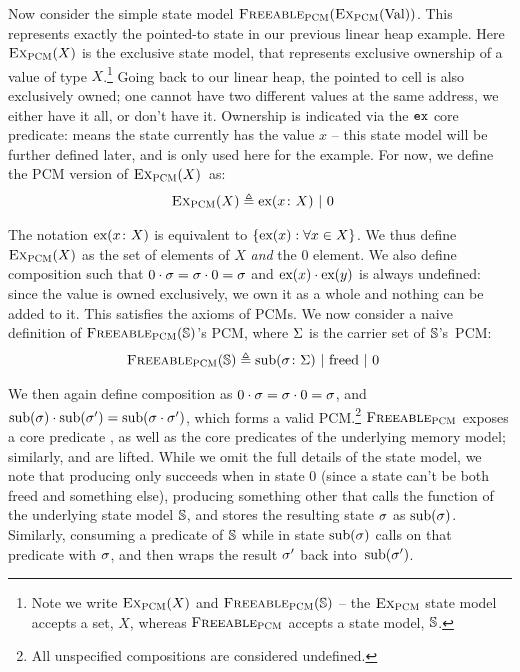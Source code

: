 Now consider the simple state model $\textsc{Freeable}_{\textsc{PCM}}(\textsc{Ex}_{\textsc{PCM}}(\text{Val}))$. This represents exactly the pointed-to state in our previous linear heap example. Here $\textsc{Ex}_{\textsc{PCM}}(X)$ is the exclusive state model, that represents exclusive ownership of a value of type $X$.\footnote{Note we write $\textsc{Ex}_{\textsc{PCM}}(X)$ and $\textsc{Freeable}_{\textsc{PCM}}(\mathbb S)$ -- the $\textsc{Ex}_{\textsc{PCM}}$ state model accepts a set, $X$, whereas $\textsc{Freeable}_{\textsc{PCM}}$ accepts a state model, $\mathbb S$.} Going back to our linear heap, the pointed to cell is also exclusively owned; one cannot have two different values at the same address, we either have it all, or don't have it. Ownership is indicated via the $\texttt{ex}$ core predicate:  means the state currently has the value $x$ -- this state model will be further defined later, and is only used here for the example. For now, we define the PCM version of $\textsc{Ex}_{\textsc{PCM}}(X)$~as:
\begin{align*}
	\textsc{Ex}_{\textsc{PCM}}(X) &\triangleq \text{ex}(x\colon X) ~|~ 0
\end{align*}

The notation $\text{ex}(x\colon X)$ is equivalent to $\{ \text{ex}(x) : \forall x\in X \}$. We thus define $\textsc{Ex}_{\textsc{PCM}}(X)$ as the set of elements of $X$ \emph{and} the $0$ element. We also define composition such that $0\cdot \sigma=\sigma\cdot 0=\sigma$ and $\text{ex}(x) \cdot \text{ex}(y)$ is always undefined: since the value is owned exclusively, we own it as a whole and nothing can be added to it. This satisfies the axioms of PCMs. We now consider a naive definition of $\textsc{Freeable}_{\textsc{PCM}}(\mathbb S)$'s PCM, where $\Sigma$ is the carrier set of $\mathbb S$'s~PCM:
\begin{align*}
	\textsc{Freeable}_{\textsc{PCM}}(\mathbb S) &\triangleq \text{sub}(\sigma\colon \Sigma) ~|~ \text{freed} ~|~ 0
\end{align*}

We then again define composition as $0 \cdot \sigma=\sigma \cdot 0=\sigma$, and $\text{sub}(\sigma) \cdot \text{sub}(\sigma')=\text{sub}(\sigma\cdot \sigma')$, which forms a valid PCM.\footnote{All unspecified compositions are considered undefined.} $\textsc{Freeable}_{\textsc{PCM}}$ exposes a core predicate \freedP, as well as the core predicates of the underlying memory model; similarly, \consume{} and \produce{} are lifted. While we omit the full details of the state model, we note that producing \freedP{} only succeeds when in state $0$ (since a state can't be both freed and something else), producing something other that \freedP{} calls the \produce{} function of the underlying state model $\mathbb S$, and stores the resulting state $\sigma$ as $\text{sub}(\sigma)$. Similarly, consuming a predicate of $\mathbb S$ while in state $\text{sub}(\sigma)$ calls \consume{} on that predicate with $\sigma$, and then wraps the result $\sigma'$ back into~$\text{sub}(\sigma')$.

